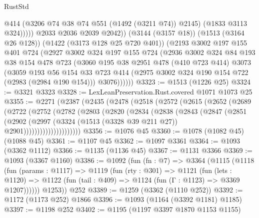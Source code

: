 \begin{lexlean}{RustStd}
\begin{coremodule}
{\begin{coremodule}
{{{{{{{{                  @414
                  (@3206 @74 @38 @74 @551 (@1492 (@3211 @74)) @2145)
                  (@1833 @3113 @324)))))
          @2033
          @2036
          @2039
          @2042))
      (@3144 (@3157 @18))
      (@1513 (@3164 @26 @128))
      (@1422 (@3173 @128 @25 @720 @401))
      (@2193
        @3002
        @197
        @155
        @401
        @724
        (@2927
          @3002
          @324
          @197
          @155
          @724
          (@2936
            @3002
            @324
            @84
            @193
            @38
            @154
            @478
            @723
            (@3060
              @195
              @38
              @2951
              @478
              (@410 @723 @414)
              @3073
              (@3059
                @193
                @56
                @154
                @33
                @723
                @414
                (@2975 @3002 @324 @190 @154 @722 (@2983 (@2984 @190 @154)))
                @3076))))))
@3323 := @1513 (@1226 @25)
@3324 := @3321 @3323
@3328 := LexLeanPreservation.Rust.covered @1071 @1073 @25
@3355 := @2271
    (@2387
      (@2435
        (@2478
          (@2518
            (@2572
              (@2615
                (@2652
                  (@2689
                    (@2722
                      (@2752
                        (@2782
                          (@2803
                            (@2820
                              (@2834
                                (@2838
                                  (@2843
                                    (@2847
                                      (@2851
                                        (@2902
                                          (@2997
                                            (@3324
                                              (@1513 (@3328 @39 @211 @27))
                                              @2901)))))))))))))))))))))
@3356 := @1076 @45
@3360 := @1078 (@1082 @45) (@1088 @45)
@3361 := @1107 @45
@3362 := @1097 @3361
@3364 := @1093 (@3362 @1112)
@3366 := @1135 (@1136 @45)
@3367 := @1131 @3366
@3369 := @1093 (@3367 @1160)
@3386 := @1092
    (fun (fn : @7) =>
    @3364
      (@1115
        (@1118
          (fun (params : @1117) =>
          @1119
            (fun (rty : @301) =>
            @1121
              (fun (lets : @1120) =>
              @1122 (fun (tail : @409) => @1124 (fun (Γ : @1123) => @3369 @1207))))))
        @1253))
    @252
@3389 := @1259 (@3362 (@1110 @252))
@3392 := @1172 (@1173 @252) @1866
@3396 := @1093 (@1164 (@3392 @1181) @1185)
@3397 := @1198 @252
@3402 := @1195 (@1197 @3397 @1870 @1153 @1155)
}}}}}}}}
\end{coremodule}}
\end{coremodule}
\end{lexlean}
